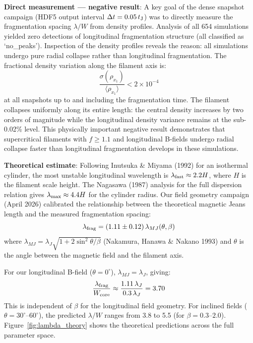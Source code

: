 \documentclass[twoside,twocolumn]{mnras}
\begin{document}
\textbf{Direct measurement --- negative result}: A key goal of the dense snapshot campaign (HDF5 output interval $\Delta t = 0.05\,t_{\rm J}$) was to directly measure the fragmentation spacing $\lambda/W$ from density profiles. Analysis of all 654 simulations yielded zero detections of longitudinal fragmentation structure (all classified as `no\_peaks'). Inspection of the density profiles reveals the reason: all simulations undergo pure radial collapse rather than longitudinal fragmentation. The fractional density variation along the filament axis is:
\begin{equation}
\frac{\sigma(\rho_{x_1})}{\langle \rho_{x_1} \rangle} < 2 \times 10^{-4}
\end{equation}
at all snapshots up to and including the fragmentation time. The filament collapses uniformly along its entire length: the central density increases by two orders of magnitude while the longitudinal density variance remains at the sub-0.02\% level. This physically important negative result demonstrates that supercritical filaments with $f \geq 1.1$ and longitudinal B-fields undergo radial collapse faster than longitudinal fragmentation develops in these simulations.

\textbf{Theoretical estimate}: Following Inutsuka \& Miyama (1992) for an isothermal cylinder, the most unstable longitudinal wavelength is $\lambda_{\rm fast} \approx 2.2 H$, where $H$ is the filament scale height. The Nagasawa (1987) \citep{Nagasawa1987} analysis for the full dispersion relation gives $\lambda_{\rm max} \approx 4.4 H$ for the cylinder radius. Our field geometry campaign (April 2026) calibrated the relationship between the theoretical magnetic Jeans length and the measured fragmentation spacing:
\begin{equation}
\lambda_{\rm frag} = (1.11 \pm 0.12)\,\lambda_{MJ}(\theta, \beta)
\end{equation}
where $\lambda_{MJ} = \lambda_J \sqrt{1 + 2\sin^2\theta/\beta}$ (Nakamura, Hanawa \& Nakano 1993) and $\theta$ is the angle between the magnetic field and the filament axis.

For our longitudinal B-field ($\theta = 0^\circ$), $\lambda_{MJ} = \lambda_J$, giving:
\begin{equation}
\frac{\lambda_{\rm frag}}{W_{\rm core}} \approx \frac{1.11\,\lambda_J}{0.3\,\lambda_J} = 3.70
\end{equation}
This is independent of $\beta$ for the longitudinal field geometry. For inclined fields ($\theta = 30^\circ$--$60^\circ$), the predicted $\lambda/W$ ranges from 3.8 to 5.5 (for $\beta = 0.3$--$2.0$). Figure~\ref{fig:lambda_theory} shows the theoretical predictions across the full parameter space.
\end{document}
